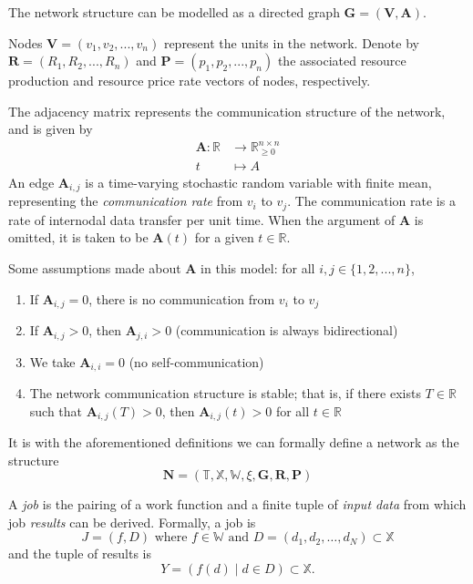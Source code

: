 \documentclass[../mthe-493-project-proposal.tex]{subfiles}
\begin{document}
    The network structure can be modelled as a directed graph $\mathbf{G} = (\mathbf{V}, \mathbf{A})$.

    Nodes $\mathbf{V} = (v_1, v_2, ..., v_n)$ represent the units in the network. Denote by $\mathbf{R} = (R_1, R_2, ..., R_n)$ and $\mathbf{P} = (p_1, p_2, ..., p_n)$ the associated resource production and resource price rate vectors of nodes, respectively.

    The adjacency matrix represents the communication structure of the network, and is given by
    \begin{align*}
        \mathbf{A} \colon \mathbb{R} &\to \mathbb{R}^{n \times n}_{\geq 0} \\
        t                            &\mapsto A
    \end{align*}
    An edge $\mathbf{A}_{i,j}$ is a time-varying stochastic random variable with finite mean, representing the \textit{communication rate} from $v_i$ to $v_j$. The communication rate is a rate of internodal data transfer per unit time. When the argument of $\mathbf{A}$ is omitted, it is taken to be $\mathbf{A}(t)$ for a given $t \in \mathbb{R}$.

    Some assumptions made about $\mathbf{A}$ in this model: for all $i, j \in \{1, 2, ..., n\}$,
    \begin{enumerate}
        \item If $\mathbf{A}_{i,j} = 0$, there is no communication from $v_i$ to $v_j$
        \item If $\mathbf{A}_{i,j} > 0$, then $\mathbf{A}_{j,i} > 0$ (communication is always bidirectional)
        \item We take $\mathbf{A}_{i,i} = 0$ (no self-communication)
        \item The network communication structure is stable; that is, if there exists $T \in \mathbb{R}$ such that $\mathbf{A}_{i,j}(T) > 0$, then $\mathbf{A}_{i,j}(t) > 0$ for all $t \in \mathbb{R}$
    \end{enumerate}

    It is with the aforementioned definitions we can formally define a network as the structure
    \begin{equation}
        \label{eq:network}
        \mathbf{N} = (\mathbb{T}, \mathbb{X}, \mathbb{W}, \xi, \mathbf{G}, \mathbf{R}, \mathbf{P})
    \end{equation}

    A \textit{job} is the pairing of a work function and a finite tuple of \textit{input data} from which job \textit{results} can be derived. Formally, a job is
    \begin{equation*}
        J = (f, D) \text{ where } f \in \mathbb{W} \text{ and } D = (d_1, d_2, \dotsc, d_N) \subset \mathbb{X}
    \end{equation*}
    and the tuple of results is
    \begin{equation*}
        Y = (f(d) \mid d \in D) \subset \mathbb{X}.
    \end{equation*}
\end{document}
